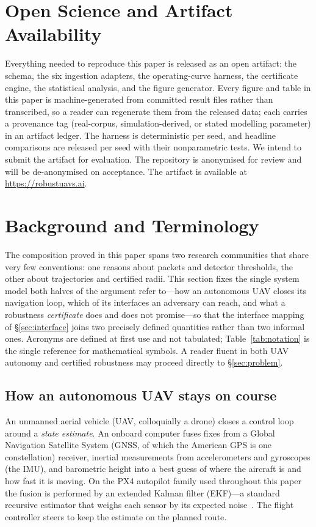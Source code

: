 \section{Open Science and Artifact Availability}
\label{sec:openscience}
Everything needed to reproduce this paper is released as an open artifact: the
schema, the six ingestion adapters, the operating-curve harness, the
certificate engine, the statistical analysis, and the figure generator. Every
figure and table in this paper is machine-generated from committed result files
rather than transcribed, so a reader can regenerate them from the released data;
each carries a provenance tag (real-corpus, simulation-derived, or stated
modelling parameter) in an artifact ledger. The harness is deterministic per
seed, and headline comparisons are released per seed with their nonparametric
tests. We intend to submit the artifact for evaluation.
\ifanon
The repository is anonymised for review and will be de-anonymised on acceptance.
\else
The artifact is available at \url{https://robustuavs.ai}.
\fi

\appendix

\section{Background and Terminology}
\label{sec:background}
The composition proved in this paper spans two research communities that share
very few conventions: one reasons about packets and detector thresholds, the
other about trajectories and certified radii. This section fixes the single
system model both halves of the argument refer to---how an autonomous UAV closes
its navigation loop, which of its interfaces an adversary can reach, and what a
robustness \emph{certificate} does and does not promise---so that the interface
mapping of \S\ref{sec:interface} joins two precisely defined quantities rather
than two informal ones. Acronyms are defined at first use and not tabulated;
Table~\ref{tab:notation} is the single reference for mathematical symbols. A
reader fluent in both UAV autonomy and certified robustness may proceed directly
to \S\ref{sec:problem}.

\subsection{How an autonomous UAV stays on course}
An unmanned aerial vehicle (UAV, colloquially a drone) closes a control loop
around a \emph{state estimate}. An onboard computer fuses fixes from a Global
Navigation Satellite System (GNSS, of which the American GPS is one
constellation) receiver, inertial measurements from accelerometers and
gyroscopes (the IMU), and barometric height into a best guess of where the
aircraft is and how fast it is moving. On the PX4 autopilot family used
throughout this paper the fusion is performed by an extended Kalman filter
(EKF)---a standard recursive estimator that weighs each sensor by its expected
noise~\cite{kong2024px4ekf}. The flight controller steers to keep the estimate
on the planned route.

